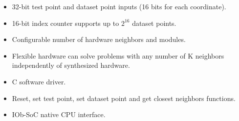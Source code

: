 \begin{itemize}
  \item 32-bit test point and dataset point inputs (16 bits for each coordinate).
  \item 16-bit index counter supports up to $2^{16}$ dataset points.
\item Configurable number of hardware neighbors and modules.
\item Flexible hardware can solve problems with any number of K neighbors independently of synthesized hardware. 
\item C software driver.
\item Reset, set test point, set dataset point and get closest neighbors functions.
\item IOb-SoC native CPU interface.
\end{itemize}
